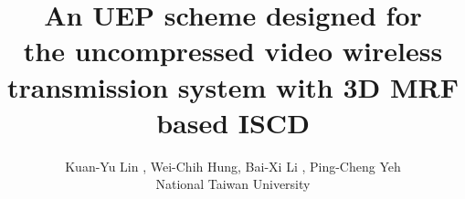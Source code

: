 \documentclass[10pt,twocolumn,twoside]{IEEEtran}
\begin{document}
\title{An UEP scheme designed for \\ the uncompressed video wireless transmission system with 3D MRF based ISCD}


\author{ Kuan-Yu Lin , Wei-Chih Hung, Bai-Xi Li , Ping-Cheng Yeh \\
National Taiwan University}%

% 
%



% 







\end{document}
